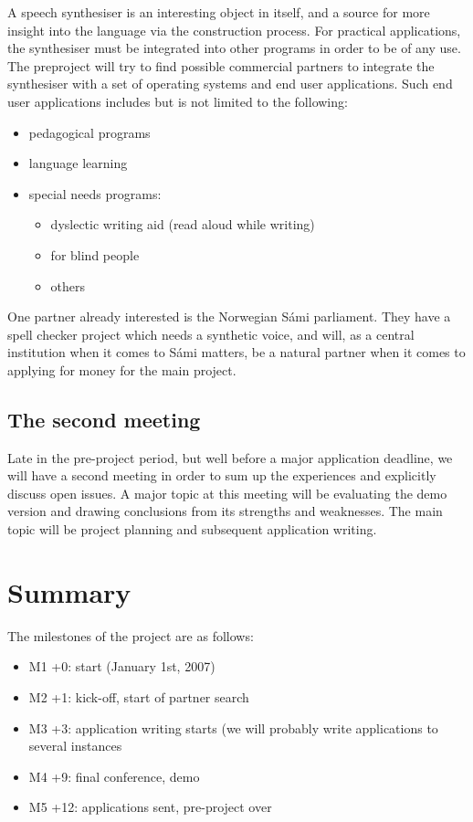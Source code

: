 \documentclass[a4paper,english]{article}
\begin{document}
A speech synthesiser is an interesting object in itself, and a source for more insight into the language via the construction process. For practical applications, the synthesiser must be integrated into other programs in order to be of any use. The preproject will try to find possible commercial partners to integrate the synthesiser with a set of operating systems and end user applications. Such end user applications includes but is not limited to the following:

\begin{itemize}
\item pedagogical programs
\item language learning
\item special needs programs:
\begin{itemize}
\item  dyslectic writing aid (read aloud while writing)
\item  for blind people
\item  others
\end{itemize}
\end{itemize}

One partner already interested is the Norwegian Sámi parliament. They have a spell checker project which needs a synthetic voice, and will, as a central institution when it comes to Sámi matters, be a natural partner when it comes to applying for money for the main project.

\subsection{The second meeting}

Late in the pre-project period, but well before a major application deadline, we will have a second meeting in order to sum up the experiences and explicitly discuss open issues. A major topic at this meeting will be evaluating the demo version and drawing conclusions from its strengths and weaknesses. The main topic will be project planning and subsequent application writing.


\section{Summary}

The milestones of the project are as follows:

\begin{itemize}
\item M1 +0:  start (January 1st, 2007)
\item M2 +1:  kick-off, start of partner search
\item M3 +3:  application writing starts (we will probably write applications to several instances
\item M4 +9:  final conference, demo
\item M5 +12: applications sent, pre-project over
\end{itemize}
\end{document}
